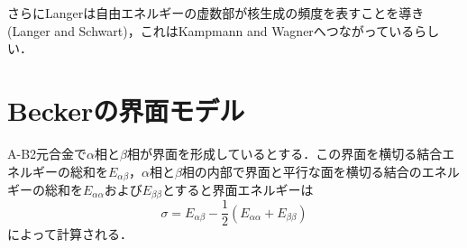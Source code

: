 \documentclass[a4j,10pt]{jarticle}
\begin{document}
さらにLangerは自由エネルギーの虚数部が核生成の頻度を表すことを導き(Langer and Schwart)，これはKampmann and Wagnerへつながっているらしい．

\section{Beckerの界面モデル}
A-B2元合金で$\alpha$相と$\beta$相が界面を形成しているとする．この界面を横切る結合エネルギーの総和を$E_{\alpha \beta}$，$\alpha$相と$\beta$相の内部で界面と平行な面を横切る結合のエネルギーの総和を$E_{\alpha \alpha}$および$E_{\beta \beta}$とすると界面エネルギーは
\begin{equation}
\sigma = E_{\alpha \beta} - 
\frac{1}{2} \left(E_{\alpha \alpha}+E_{\beta \beta} \right)
\end{equation}
によって計算される．
\end{document}
